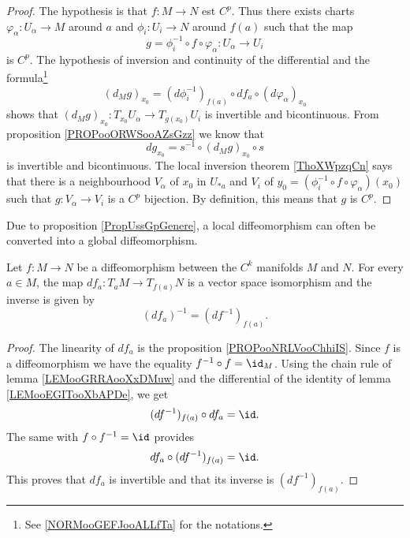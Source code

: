 \begin{proof}
	The hypothesis is that \(f \colon M\to N  \) est \( C^p\). Thus there exists charts \(\varphi_{\alpha} \colon U_{\alpha}\to M  \) around \( a\) and \(\phi_i \colon U_i\to N  \) around \( f(a)\) such that the map
	\begin{equation}
		g=\phi_i^{-1}\circ f\circ\varphi_{\alpha} \colon U_{\alpha}\to U_i
	\end{equation}
	is \( C^p\). The hypothesis of inversion and continuity of the differential and the formula\footnote{See \ref{NORMooGEFJooALLfTa} for the notations.}
	\begin{equation}
		(d_Mg)_{x_0}=(d\phi_i^{-1})_{f(a)}\circ df_a\circ (d\varphi_{\alpha})_{x_0}
	\end{equation}
	shows that \((d_Mg)_{x_0} \colon T_{x_0}U_{\alpha}\to T_{g(x_0)}U_i  \) is invertible and bicontinuous. From proposition \ref{PROPooORWSooAZsGzz} we know that
	\begin{equation}
		dg_{x_0}=s^{-1}\circ (d_Mg)_{x_0}\circ s
	\end{equation}
	is invertible and bicontinuous. The local inversion theorem \ref{ThoXWpzqCn} says that there is a neighbourhood \( V_{\alpha}\) of \( x_0\) in \( U_{*a}\) and \( V_i\) of \( y_0=(\phi_i^{-1}\circ f\circ\varphi_{\alpha})(x_0)\) such that \(g \colon V_{\alpha}\to V_i  \) is a \( C^p\) bijection. By definition, this means that \( g\) is \( C^p\).
\end{proof}


Due to proposition \ref{PropUssGpGenere}, a local diffeomorphism can often be converted into a global diffeomorphism.


\begin{proposition}       \label{PROPooPEMLooPQcywG}
	Let \( f\colon M\to N\) be a diffeomorphism between the \( C^k\) manifolds \( M\) and \( N\). For every \( a\in M\), the map \( df_a\colon T_aM\to T_{f(a)}N\) is a vector space isomorphism and the inverse is given by
	\begin{equation}
		(df_a)^{-1}=(df^{-1})_{f(a)}.
	\end{equation}
\end{proposition}

\begin{proof}
	The linearity of \( df_a\) is the proposition \ref{PROPooNRLVooChhiIS}. Since \( f\) is a diffeomorphism we have the equality \( f^{-1}\circ f=\id_M\). Using the chain rule of lemma \ref{LEMooGRRAooXxDMuw} and the differential of the identity of lemma \ref{LEMooEGITooXbAPDe}, we get
	\begin{equation}
		(df^{-1})_{f(a)}\circ df_a=\id.
	\end{equation}
	The same with \( f\circ f^{-1}=\id\) provides
	\begin{equation}
		df_a\circ(df^{-1})_{f(a)}=\id.
	\end{equation}
	This proves that \( df_a\) is invertible and that its inverse is \( (df^{-1})_{f(a)}\).


\end{proof}

